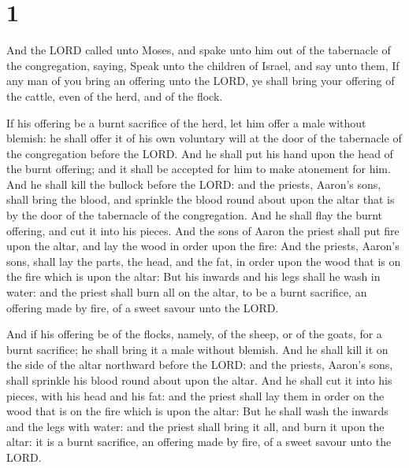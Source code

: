 \hypertarget{section}{%
\section{1}\label{section}}

 And the LORD called unto Moses, and spake unto him out of
the tabernacle of the congregation, saying,  Speak unto
the children of Israel, and say unto them, If any man of you bring an
offering unto the LORD, ye shall bring your offering of the cattle, even
of the herd, and of the flock.

 If his offering be a burnt sacrifice of the herd, let him
offer a male without blemish: he shall offer it of his own voluntary
will at the door of the tabernacle of the congregation before the LORD.
 And he shall put his hand upon the head of the burnt
offering; and it shall be accepted for him to make atonement for him.
 And he shall kill the bullock before the LORD: and the
priests, Aaron's sons, shall bring the blood, and sprinkle the blood
round about upon the altar that is by the door of the tabernacle of the
congregation.  And he shall flay the burnt offering, and
cut it into his pieces.  And the sons of Aaron the priest
shall put fire upon the altar, and lay the wood in order upon the fire:
 And the priests, Aaron's sons, shall lay the parts, the
head, and the fat, in order upon the wood that is on the fire which is
upon the altar:  But his inwards and his legs shall he
wash in water: and the priest shall burn all on the altar, to be a burnt
sacrifice, an offering made by fire, of a sweet savour unto the LORD.

 And if his offering be of the flocks, namely, of the
sheep, or of the goats, for a burnt sacrifice; he shall bring it a male
without blemish.  And he shall kill it on the side of the
altar northward before the LORD: and the priests, Aaron's sons, shall
sprinkle his blood round about upon the altar.  And he
shall cut it into his pieces, with his head and his fat: and the priest
shall lay them in order on the wood that is on the fire which is upon
the altar:  But he shall wash the inwards and the legs
with water: and the priest shall bring it all, and burn it upon the
altar: it is a burnt sacrifice, an offering made by fire, of a sweet
savour unto the LORD.

